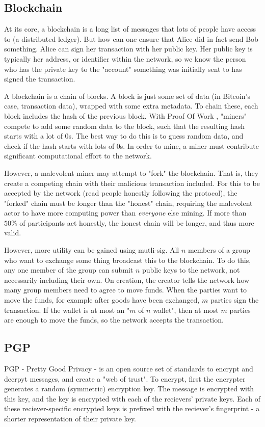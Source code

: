 \documentclass{article}
\begin{document}
\subsection{Blockchain}
At its core, a blockchain is a long list of messages that lots of people have access to (a distributed ledger).
But how can one ensure that Alice did in fact send Bob something.
Alice can sign her transaction with her public key.
Her public key is typically her address, or identifier within the network,
so we know the person who has the private key to the "account"
something was initially sent to has signed the transaction.

A blockchain is a chain of blocks.
A block is just some set of data (in Bitcoin's case, transaction data), wrapped with some extra metadata.
To chain these, each block includes the hash of the previous block.
With Proof Of Work \cite{Bitcoin}, "miners" compete to add some random data to the block,
such that the resulting hash starts with a lot of $0$s.
The best way to do this is to guess random data,
and check if the hash starts with lots of $0$s.
In order to mine, a miner must contribute significant computational effort to the network.

However, a malevolent miner may attempt to "fork" the blockchain.
That is, they create a competing chain with their malicious transaction included.
For this to be accepted by the network (read people honestly following the protocol),
the "forked" chain must be longer than the "honest" chain,
requiring the malevolent actor to have more computing power than \emph{everyone} else mining.
If more than $50\%$ of participants act honestly, the honest chain will be longer, and thus more valid.

However, more utility can be gained using mutli-sig.
All $n$ members of a group who want to exchange some thing broadcast this to the blockchain.
To do this, any one member of the group can submit $n$ public keys to the network, not necessarily including their own.
On creation, the creator tells the network how many group members need to agree to move funds.
When the parties want to move the funds, for example after goods have been exchanged,
$m$ parties sign the transaction.
If the wallet is at most an "$m$ of $n$ wallet", then at most $m$ parties are
enough to move the funds, so the network accepts the transaction.

\subsection{PGP}
PGP - Pretty Good Privacy - is an open source set of standards to
encrypt and decrpyt messages, and create a "web of trust".
To encrypt, first the encrypter generates a random (symmetric) encryption key.
The message is encrypted with this key,
and the key is encrypted with each of the recievers' private keys.
Each of these reciever-specific encrypted keys is prefixed with the
reciever's fingerprint - a shorter representation of their private key.
\end{document}
